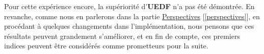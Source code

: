 	Pour cette expérience encore, la supériorité d'\textbf{UEDF} n'a pas été démontrée.
	En revanche, comme nous en parlerons dans la partie \hyperref[contexte]{Perspectives} [\ref*{perspectives}], en procédant à quelques changements dans l'implémentation, 
	nous pensons que ces résultats peuvent grandement s'améliorer, et en fin de compte, ces premiers indices peuvent être 
	considérés comme prometteurs pour la suite.




	